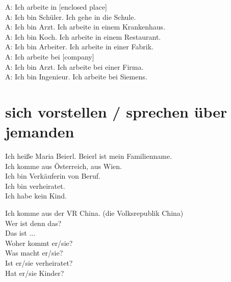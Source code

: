 \noindent
A: Ich arbeite in [enclosed place] \\
A: Ich bin Schüler. Ich gehe in die Schule.  \\
A: Ich bin Arzt. Ich arbeite in einem Krankenhaus.  \\
A: Ich bin Koch. Ich arbeite in einem Restaurant.  \\
A: Ich bin Arbeiter. Ich arbeite in einer Fabrik.  \\

\noindent
A: Ich arbeite bei [company]  \\
A: Ich bin Arzt. Ich arbeite bei einer Firma. \\
A: Ich bin Ingenieur. Ich arbeite bei Siemens. \\

\section{sich vorstellen / sprechen über jemanden}
Ich heiße Maria Beierl. Beierl ist mein Familienname.  \\
Ich komme aus Österreich, aus Wien. \\
Ich bin Verkäuferin von Beruf. \\
Ich bin verheiratet. \\
Ich habe kein Kind. 

Ich komme aus der VR China. (die Volksrepublik China) \\

Wer ist denn das? \\ 
Das ist ... \\
Woher kommt er/sie? \\
Was macht er/sie? \\
Ist er/sie verheiratet? \\
Hat er/sie Kinder? \\

